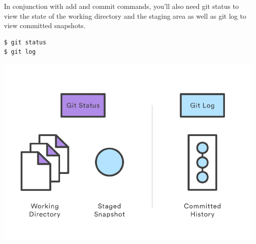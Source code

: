\documentclass{article}
\begin{document}
In conjunction with add and commit commands, you'll also need git status to
view the state of the working directory and the staging area as well
as git log to view committed snapshots.

\begin{lstlisting}
$ git status
$ git log
\end{lstlisting}

\begin{center}
\includegraphics[scale=0.5]{figures/05.pdf}
\end{center}
\end{document}
